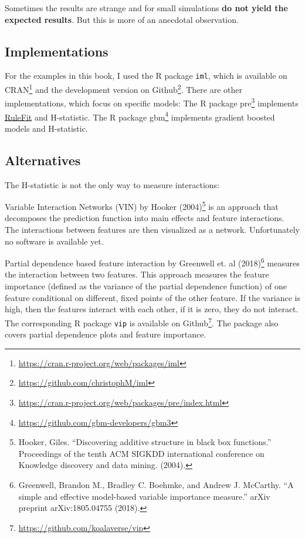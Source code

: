 \documentclass[
  12pt,
]{krantz}
\renewcommand{\href}[2]{#2\footnote{\url{#1}}}
\begin{document}
Sometimes the results are strange and for small simulations \textbf{do not yield the expected results}.
But this is more of an anecdotal observation.

\hypertarget{implementations}{%
\subsection{Implementations}\label{implementations}}

For the examples in this book, I used the R package \texttt{iml}, which is available on \href{https://cran.r-project.org/web/packages/iml}{CRAN} and the development version on \href{https://github.com/christophM/iml}{Github}.
There are other implementations, which focus on specific models:
The R package \href{https://cran.r-project.org/web/packages/pre/index.html}{pre} implements \protect\hyperlink{rulefit}{RuleFit} and H-statistic.
The R package \href{https://github.com/gbm-developers/gbm3}{gbm} implements gradient boosted models and H-statistic.

\hypertarget{alternatives}{%
\subsection{Alternatives}\label{alternatives}}

The H-statistic is not the only way to measure interactions:

Variable Interaction Networks (VIN) by Hooker (2004)\footnote{Hooker, Giles. ``Discovering additive structure in black box functions.'' Proceedings of the tenth ACM SIGKDD international conference on Knowledge discovery and data mining. (2004).} is an approach that decomposes the prediction function into main effects and feature interactions.
The interactions between features are then visualized as a network.
Unfortunately no software is available yet.

Partial dependence based feature interaction by Greenwell et. al (2018)\footnote{Greenwell, Brandon M., Bradley C. Boehmke, and Andrew J. McCarthy. ``A simple and effective model-based variable importance measure.'' arXiv preprint arXiv:1805.04755 (2018).} measures the interaction between two features.
This approach measures the feature importance (defined as the variance of the partial dependence function) of one feature conditional on different, fixed points of the other feature.
If the variance is high, then the features interact with each other, if it is zero, they do not interact.
The corresponding R package \texttt{vip} is available on \href{https://github.com/koalaverse/vip}{Github}.
The package also covers partial dependence plots and feature importance.
\end{document}
